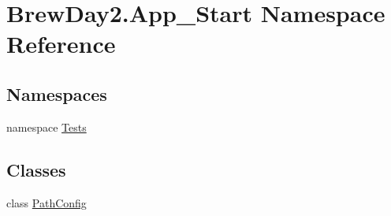 \hypertarget{namespace_brew_day2_1_1_app___start}{}\section{Brew\+Day2.\+App\+\_\+\+Start Namespace Reference}
\label{namespace_brew_day2_1_1_app___start}
\subsection*{Namespaces}
\begin{DoxyCompactItemize}
\item 
namespace \mbox{\hyperlink{namespace_brew_day2_1_1_app___start_1_1_tests}{Tests}}
\end{DoxyCompactItemize}
\subsection*{Classes}
\begin{DoxyCompactItemize}
\item 
class \mbox{\hyperlink{class_brew_day2_1_1_app___start_1_1_path_config}{Path\+Config}}
\end{DoxyCompactItemize}
